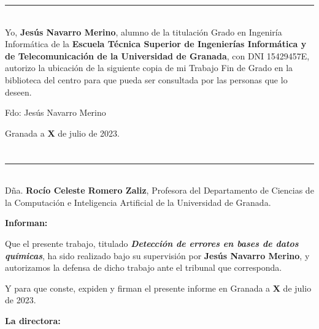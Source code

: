 \noindent\rule[-1ex]{\textwidth}{2pt}\\[4.5ex]

Yo, \textbf{Jesús Navarro Merino}, alumno de la titulación Grado en Ingeniría Informática de la \textbf{Escuela Técnica Superior
de Ingenierías Informática y de Telecomunicación de la Universidad de Granada}, con DNI 15429457E, autorizo la
ubicación de la siguiente copia de mi Trabajo Fin de Grado en la biblioteca del centro para que pueda ser
consultada por las personas que lo deseen.

\vspace{6cm}

\noindent Fdo: Jesús Navarro Merino

\vspace{2cm}

\begin{flushright}
Granada a \textbf{X} de julio de 2023.
\end{flushright}


\chapter*{}
\thispagestyle{empty}

\noindent\rule[-1ex]{\textwidth}{2pt}\\[4.5ex]

Dña. \textbf{Rocío Celeste Romero Zaliz}, Profesora del Departamento de Ciencias de la Computación e Inteligencia Artificial de la Universidad de Granada.


\vspace{0.5cm}

\textbf{Informan:}

\vspace{0.5cm}

Que el presente trabajo, titulado \textit{\textbf{Detección de errores en bases de datos químicas}},
ha sido realizado bajo su supervisión por \textbf{Jesús Navarro Merino}, y autorizamos la defensa de dicho trabajo ante el tribunal que corresponda.

\vspace{0.5cm}

Y para que conste, expiden y firman el presente informe en Granada a \textbf{X} de julio de 2023.

\vspace{1cm}

\textbf{La directora:}

\vspace{5cm}

